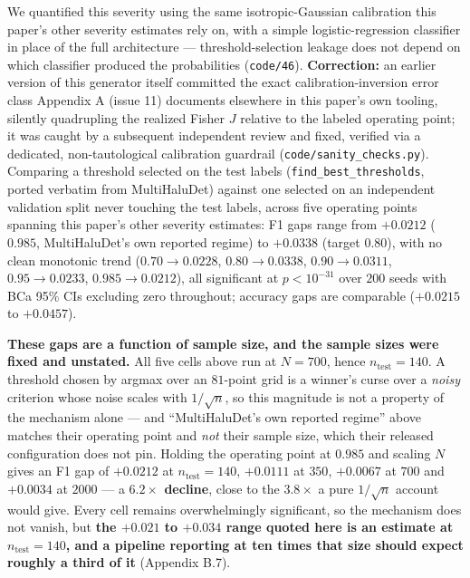 \documentclass[10pt]{article} %
\begin{document}
We quantified this severity using the same isotropic-Gaussian calibration this
paper's other severity estimates rely on, with a simple logistic-regression
classifier in place of the full architecture --- threshold-selection leakage
does not depend on which classifier produced the probabilities
(\texttt{code/46}). \textbf{Correction:} an earlier version of this generator
itself committed the exact calibration-inversion error class Appendix A
(issue 11) documents elsewhere in this paper's own tooling, silently
quadrupling the realized Fisher $J$ relative to the labeled operating point; it
was caught by a subsequent independent review and fixed, verified via a
dedicated, non-tautological calibration guardrail
(\texttt{code/sanity\_checks.py}). Comparing a threshold selected on the test
labels (\texttt{find\_best\_thresholds}, ported verbatim from MultiHaluDet)
against one selected on an independent validation split never touching the test
labels, across five operating points spanning this paper's other severity
estimates: F1 gaps range from $+0.0212$ ($0.985$, MultiHaluDet's own reported
regime) to $+0.0338$ (target $0.80$), with no clean monotonic trend
($0.70{\to}0.0228$, $0.80{\to}0.0338$, $0.90{\to}0.0311$, $0.95{\to}0.0233$,
$0.985{\to}0.0212$), all significant at $p<10^{-31}$ over $200$ seeds with BCa
95\% CIs excluding zero throughout; accuracy gaps are comparable ($+0.0215$ to
$+0.0457$).

\textbf{These gaps are a function of sample size, and the sample sizes were
fixed and unstated.} All five cells above run at $N=700$, hence
$n_{\text{test}}=140$. A threshold chosen by argmax over an $81$-point grid is
a winner's curse over a \emph{noisy} criterion whose noise scales with
$1/\sqrt{n}$, so this magnitude is not a property of the mechanism alone --- and
``MultiHaluDet's own reported regime'' above matches their operating point and
\emph{not} their sample size, which their released configuration does not pin.
Holding the operating point at $0.985$ and scaling $N$ gives an F1 gap of
$+0.0212$ at $n_{\text{test}}=140$, $+0.0111$ at $350$, $+0.0067$ at $700$ and
$+0.0034$ at $2000$ --- a \textbf{$6.2\times$ decline}, close to the
$3.8\times$ a pure $1/\sqrt{n}$ account would give. Every cell remains
overwhelmingly significant, so the mechanism does not vanish, but \textbf{the
$+0.021$ to $+0.034$ range quoted here is an estimate at $n_{\text{test}}=140$,
and a pipeline reporting at ten times that size should expect roughly a third
of it} (Appendix B.7).
\end{document}
